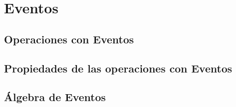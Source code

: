 \section{Eventos}
    \lipsum
    \subsection{Operaciones con Eventos}
        \lipsum[1]
    \subsection{Propiedades de las operaciones con Eventos}
        \lipsum[1]
    \subsection{Álgebra de Eventos}
        \lipsum[1]
    